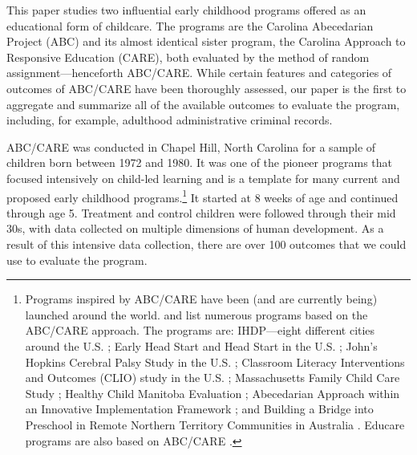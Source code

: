 

This paper studies two influential early childhood programs offered as an educational form of childcare. The programs are the Carolina Abecedarian Project (ABC) and its almost identical sister program, the Carolina Approach to Responsive Education (CARE), both evaluated by the method of random assignment---henceforth ABC/CARE. While certain features and categories of outcomes of ABC/CARE have been thoroughly assessed, our paper is the first to aggregate and summarize all of the available outcomes to evaluate the program, including, for example, adulthood administrative criminal records.

ABC/CARE was conducted in Chapel Hill, North Carolina for a sample of children born between 1972 and 1980. It was one of the pioneer programs that focused intensively on child-led learning and is a template for many current and proposed early childhood programs.\footnote{Programs inspired by ABC/CARE have been (and are currently being) launched around the world. \citet{Sparling_2010_Highlights} and \citet{Ramey_Ramey_Lanzi_2014_Interventions} list numerous programs based on the ABC/CARE approach. The programs are: IHDP---eight different cities around the U.S. \citep{Spiker-etal_1997_Helping}; Early Head Start and Head Start in the U.S. \citep{Schneider_McDonald-eds_2007_Scale-Up_Vol-1}; John's Hopkins Cerebral Palsy Study in the U.S. \citep{Sparling_2010_Highlights}; Classroom Literacy Interventions and Outcomes (CLIO) study in the U.S. \citep{Sparling_2010_Highlights}; Massachusetts Family Child Care Study \citep{Collins_etal_2010_Massachusetts-Study}; Healthy Child Manitoba Evaluation \citep{Healthy_Child_Manitoba_2015_Starting-Early}; Abecedarian Approach within an Innovative Implementation Framework \citep{Jensen_Nielsen_2016_ABC-Programme-Pilot}; and Building a Bridge into Preschool in Remote Northern Territory Communities in Australia \citep{UMonash_Dataset_2015_URL}. Educare programs are also based on ABC/CARE \citep{Educare_2014_Research_Agenda,Yazejian_Bryant_2012_Educare}.} It started at 8 weeks of age and continued through age 5. Treatment and control children were followed through their mid 30s, with data collected on multiple dimensions of human development. As a result of this intensive data collection, there are over 100 outcomes that we could use to evaluate the program.

